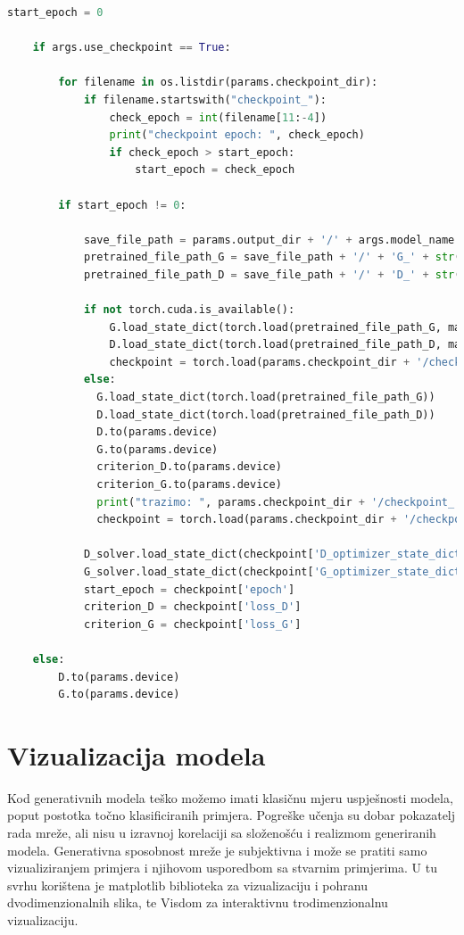 \documentclass[times, utf8, diplomski]{fer}
\begin{document}
\begin{lstlisting}[language=Python, caption=Kod za učitavanje kontrolnih točaka]
    start_epoch = 0

    if args.use_checkpoint == True:

        for filename in os.listdir(params.checkpoint_dir):
            if filename.startswith("checkpoint_"):
                check_epoch = int(filename[11:-4])
                print("checkpoint epoch: ", check_epoch)
                if check_epoch > start_epoch:
                    start_epoch = check_epoch
                    
        if start_epoch != 0:

            save_file_path = params.output_dir + '/' + args.model_name
            pretrained_file_path_G = save_file_path + '/' + 'G_' + str(start_epoch) + '.pth'
            pretrained_file_path_D = save_file_path + '/' + 'D_' + str(start_epoch) + '.pth'

            if not torch.cuda.is_available():
                G.load_state_dict(torch.load(pretrained_file_path_G, map_location={'cuda:0': 'cpu'}))
                D.load_state_dict(torch.load(pretrained_file_path_D, map_location={'cuda:0': 'cpu'}))
                checkpoint = torch.load(params.checkpoint_dir + '/checkpoint_' + str(start_epoch) + '.tar', map_location={'cuda:0': 'cpu'})
            else:
              G.load_state_dict(torch.load(pretrained_file_path_G))
              D.load_state_dict(torch.load(pretrained_file_path_D))
              D.to(params.device)
              G.to(params.device)
              criterion_D.to(params.device)
              criterion_G.to(params.device)
              print("trazimo: ", params.checkpoint_dir + '/checkpoint_' + str(start_epoch) + '.tar')
              checkpoint = torch.load(params.checkpoint_dir + '/checkpoint_' + str(start_epoch) + '.tar')

            D_solver.load_state_dict(checkpoint['D_optimizer_state_dict'])
            G_solver.load_state_dict(checkpoint['G_optimizer_state_dict'])
            start_epoch = checkpoint['epoch']
            criterion_D = checkpoint['loss_D']
            criterion_G = checkpoint['loss_G']

    else:
        D.to(params.device)
        G.to(params.device)

\end{lstlisting}

\break

\section{Vizualizacija modela}
Kod generativnih modela teško možemo imati klasičnu mjeru uspješnosti modela, poput postotka točno klasificiranih primjera. Pogreške učenja su dobar pokazatelj rada mreže, ali nisu u izravnoj korelaciji sa složenošću i realizmom generiranih modela. Generativna sposobnost mreže je subjektivna i može se pratiti samo vizualiziranjem primjera i njihovom usporedbom sa stvarnim primjerima. U tu svrhu korištena je matplotlib biblioteka za vizualizaciju i pohranu dvodimenzionalnih slika, te Visdom za interaktivnu trodimenzionalnu vizualizaciju.
\end{document}
